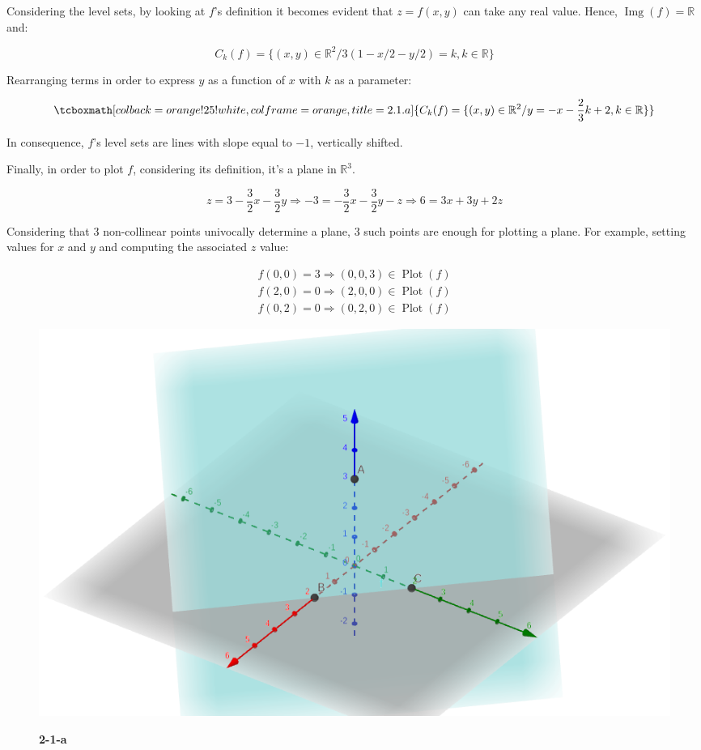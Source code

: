 \documentclass{article}
\renewcommand{\Bbb}{\mathbb}
\begin{document}
Considering the level sets, by looking at $f$'s definition it becomes evident that $z = f(x,y)$ can take any real value. Hence, $\mathop{Img}(f) = \Bbb R$ and:

\begin{equation}
C_k(f) = \{ (x,y) \in \Bbb R^2 / 3(1-x/2-y/2) = k, k \in \Bbb{R} \}
\end{equation}

Rearranging terms in order to express $y$ as a function of $x$ with $k$ as a parameter:

\begin{equation}
\tcboxmath[colback=orange!25!white,colframe=orange,title=2.1.a]
{
C_k(f) = \{ (x,y) \in \Bbb R^2 / y = -x -\frac{2}{3}k + 2, k \in \Bbb{R} \}
}
\end{equation}

In consequence, $f$'s level sets are lines with slope equal to $-1$, vertically shifted.

Finally, in order to plot $f$, considering its definition, it's a plane in $\Bbb R^3$. 

\begin{equation}
z = 3 -\frac{3}{2} x - \frac{3}{2} y \Rightarrow -3 = -\frac{3}{2}x -\frac{3}{2}y -z \Rightarrow 6 = 3x +3y +2z 
\end{equation}

Considering that 3 non-collinear points univocally determine a plane, 3 such points are enough for plotting a plane. For example, setting values for $x$ and $y$ and computing the associated $z$ value:

\begin{equation}
\begin{array}{ll}
f(0,0) = 3 \Rightarrow (0, 0, 3) \in \mathop{Plot}(f) \\
f(2,0) = 0 \Rightarrow (2, 0, 0) \in \mathop{Plot}(f) \\
f(0,2) = 0 \Rightarrow (0, 2, 0) \in \mathop{Plot}(f)
\end{array}
\end{equation}

\begin{figure}[ht]
\caption{\textbf{2-1-a}}
\includegraphics[scale=0.4]{../../common/img/exercises/2/1-a.png}
\centering
\label{fig:2-1-a}
\end{figure}
\end{document}
